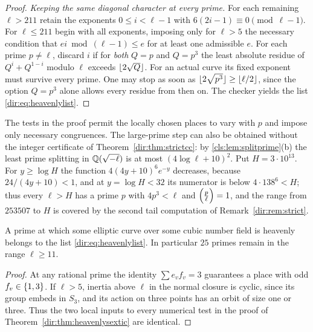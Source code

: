 \begin{proof}
\emph{Keeping the same diagonal character at every prime.} For each remaining
$\ell>211$ retain the exponents $0\le i<\ell-1$ with $6(2i-1)\equiv0\pmod{\ell-1}$.
For $\ell\le211$ begin with all exponents, imposing only for $\ell>5$ the necessary
condition that $ei\bmod(\ell-1)\le e$ for at least one admissible $e$. For each prime
$p\ne\ell$, discard $i$ if for \emph{both} $Q=p$ and $Q=p^3$ the least absolute residue
of $Q^i+Q^{1-i}$ modulo $\ell$ exceeds $\lfloor2\sqrt Q\rfloor$. For an actual curve its
fixed exponent must survive every prime. One may stop as soon as
$\lfloor2\sqrt{p^3}\rfloor\ge\lfloor\ell/2\rfloor$, since the option $Q=p^3$ alone allows every
residue from then on. The checker yields the list \eqref{dir:eq:heavenlylist}.
\end{proof}

The tests in the proof permit the locally chosen places to vary with $p$ and impose
only necessary congruences. The large-prime step can also be obtained without the
integer certificate of Theorem~\ref{dir:thm:strictcc}: by \cref{cls:lem:splitprime}(b)
the least prime splitting in $\mathbb{Q}(\sqrt{-\ell})$ is at most $(4\log\ell+10)^2$. Put $H=3\cdot10^{13}$. For $y\ge\log H$ the function $4(4y+10)^6e^{-y}$
decreases, because $24/(4y+10)<1$, and at $y=\log H<32$ its numerator is below
$4\cdot138^6<H$; thus every $\ell>H$ has a prime $p$ with $4p^3<\ell$ and
$\Bigl(\frac{p}{\ell}\Bigr)=1$, and the range from $253507$ to $H$ is covered by the second tail
computation of Remark~\ref{dir:rem:strict}.

\begin{corollary}\label{dir:cor:heavenlycubic}
A prime at which some elliptic curve over some cubic number field is heavenly belongs
to the list \eqref{dir:eq:heavenlylist}. In particular $25$ primes remain in the range
$\ell\ge11$.
\end{corollary}

\begin{proof}
At any rational prime the identity $\sum e_vf_v=3$ guarantees a place with odd
$f_v\in\{1,3\}$. If $\ell>5$, inertia above $\ell$ in the normal closure is cyclic,
since its group embeds in $S_3$, and its action on three points has an orbit of size
one or three. Thus the two local inputs to every numerical test in the proof of
Theorem~\ref{dir:thm:heavenlysextic} are identical.
\end{proof}

